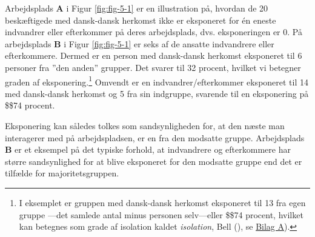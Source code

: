 \documentclass[
]{book}
\begin{document}
Arbejdsplads \textbf{A} i Figur \ref{fig:fig-5-1} er en illustration på, hvordan de 20 beskæftigede med dansk-dansk herkomst ikke er eksponeret for én eneste indvandrer eller efterkommer på deres arbejdsplads, dvs. eksponeringen er 0. På arbejdsplads \textbf{B} i Figur \ref{fig:fig-5-1} er seks af de ansatte indvandrere eller efterkommere. Dermed er en person med dansk-dansk herkomst eksponeret til 6 personer fra ''den anden'' grupper. Det svarer til 32 procent, hvilket vi betegner graden af eksponering.\footnote{I eksemplet er gruppen med dansk-dansk herkomst eksponeret til 13 fra egen gruppe ---det samlede antal minus personen selv---eller \$\approx\$74 procent, hvilket kan betegnes som grade af isolation kaldet \emph{isolation}, Bell (), se \hyperref[bilagA]{Bilag A}).} Omvendt er en indvandrer/efterkommer eksponeret til 14 med dansk-dansk herkomst og 5 fra sin indgruppe, svarende til en eksponering på \$\approx\$74 procent.

Eksponering kan således tolkes som sandsynligheden for, at den næste man interagerer med på arbejdspladsen, er en fra den modsatte gruppe. Arbejdsplads \textbf{B} er et eksempel på det typiske forhold, at indvandrere og efterkommere har større sandsynlighed for at blive eksponeret for den modsatte gruppe end det er tilfælde for majoritetsgruppen.
\end{document}

